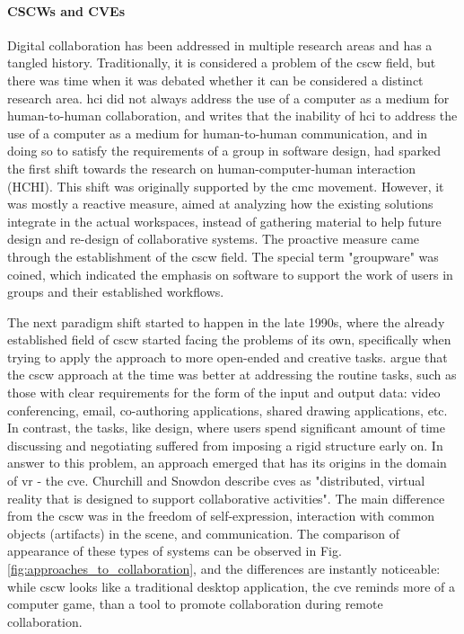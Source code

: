 


\paragraph[]{CSCWs and CVEs}
Digital collaboration has been addressed in multiple research areas and has a tangled history. Traditionally, it is considered a problem of the \gls{cscw} field, but there was time when it was debated whether it can be considered a distinct research area. 
\gls{hci} did not always address the use of a computer as a medium for human-to-human collaboration, and \cite{bannon_perspectives_nodate} writes that the inability of \gls{hci} to address the use of a computer as a medium for human-to-human communication, and in doing so to satisfy the requirements of a group in software design, had sparked the first shift towards the research on human-computer-human interaction (HCHI). 
This shift was originally supported by the \gls{cmc} movement. However, it was mostly a reactive measure, aimed at analyzing how the existing solutions integrate in the actual workspaces, instead of gathering material to help future design and re-design of collaborative systems. The proactive measure came through the establishment of the \gls{cscw} field. The special term "groupware" was coined, which indicated the emphasis on software to support the work of users in groups and their established workflows.

The next paradigm shift started to happen in the late 1990s, where the already established field of \gls{cscw} started facing the problems of its own, specifically when trying to apply the approach to more open-ended and creative tasks. \cite{churchill_collaborative_1998} argue that the \gls{cscw} approach at the time was better at addressing the routine tasks, such as those with clear requirements for the form of the input and output data: video conferencing, email, co-authoring applications, shared drawing applications, etc. In contrast, the tasks, like design, where users spend significant amount of time discussing and negotiating suffered from imposing a rigid structure early on. In answer to this problem, an approach emerged that has its origins in the domain of \gls{vr} - the \gls{cve}. Churchill and Snowdon describe \gls{cve}s as "distributed, virtual reality that is designed to support collaborative activities". The main difference from the \gls{cscw} was in the freedom of self-expression, interaction with common objects (artifacts) in the scene, and communication. The comparison of appearance of these types of systems can be observed in Fig. \ref{fig:approaches_to_collaboration}, and the differences are instantly noticeable: while \gls{cscw} looks like a traditional desktop application, the \gls{cve} reminds more of a computer game, than a tool to promote collaboration during remote collaboration. 

